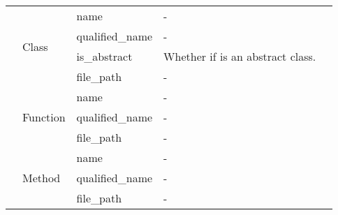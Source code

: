 \begin{tabular}{p{1.6cm}|p{1.7cm}|p{2cm}|p{3.3cm}|p{7.5cm}}
\cline{2-2}\cline{3-3}\cline{4-4}\cline{5-5}
 & \multirow{4}{*}{Class} & name & - &  \\
\cline{3-3}\cline{4-4}\cline{5-5}
 &  & qualified\_name & - &  \\
\cline{3-3}\cline{4-4}\cline{5-5}
 &  & is\_abstract & Whether if is an abstract class. &  \\
\cline{3-3}\cline{4-4}\cline{5-5}
 &  & file\_path & - &  \\
\cline{2-2}\cline{3-3}\cline{4-4}\cline{5-5}
 & \multirow{3}{*}{Function} & name & - &  \\
\cline{3-3}\cline{4-4}\cline{5-5}
 &  & qualified\_name & - &  \\
\cline{3-3}\cline{4-4}\cline{5-5}
 &  & file\_path & - &  \\
\cline{2-2}\cline{3-3}\cline{4-4}\cline{5-5}
 & \multirow{3}{*}{Method} & name & - &  \\
\cline{3-3}\cline{4-4}\cline{5-5}
 &  & qualified\_name & - &  \\
\cline{3-3}\cline{4-4}\cline{5-5}
 &  & file\_path & - &  \\
\cline{1-1}\cline{2-2}\cline{3-3}\cline{4-4}\cline{5-5}
\hline
\end{tabular}